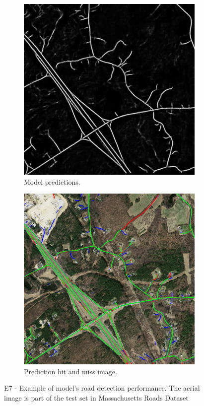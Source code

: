 \begin{figure}
\begin{subfigure}{0.48\textwidth}
\includegraphics[width=\textwidth]{figs/E7/E7-pred.jpg}
\caption{Model predictions.} \label{fig:E7_model_predictions}
\end{subfigure}
\hspace*{\fill} %
\begin{subfigure}{0.48\textwidth}
\includegraphics[width=\textwidth]{figs/E7/E7-hit.jpg}
\caption{Prediction hit and miss image.} \label{fig:E7_hit_image}
\end{subfigure}
\caption[E7 - Qualitiative results of the road extraction system ]{E7 - Example of model's road detection performance. The aerial image is part of the test set in Massachusetts Roads Dataset} \label{fig:E7_performance}
\end{figure}

